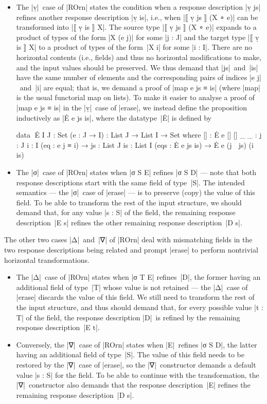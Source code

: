 \begin{itemize}
\item The |ṿ|~case of |ROrn| states the condition when a response description |ṿ js| refines another response description |ṿ is|, i.e., when |⟦ ṿ js ⟧ (X ∘ e)| can be transformed into |⟦ ṿ is ⟧ X|.
The source type |⟦ ṿ js ⟧ (X ∘ e)| expands to a product of types of the form |X (e j)| for some |j : J| and the target type |⟦ ṿ is ⟧ X| to a product of types of the form~|X i| for some |i : I|.
There are no horizontal contents (i.e., fields) and thus no horizontal modifications to make, and the input values should be preserved.
We thus demand that |js|~and~|is| have the same number of elements and the corresponding pairs of indices |e j|~and~|i| are equal; that is, we demand a proof of |map e js ≡ is| (where |map| is the usual functorial map on lists).
To make it easier to analyse a proof of |map e js ≡ is| in the |ṿ|~case of |erase|, we instead define the proposition inductively as |Ė e js is|, where the datatype~|Ė| is defined by
\begin{code}
data ^^^Ė {I J : Set} (e : J → I) : List J → List I → Set where
  []   :  Ė e [] []
  _∷_  :  {j : J} {i : I} (eq : e j ≡ i) →
          {js : List J} {is : List I} (eqs : Ė e js is) → Ė e (j ∷ js) (i ∷ is)
\end{code}
\item The |σ|~case of |ROrn| states when |σ S E| refines |σ S D| --- note that both response descriptions start with the same field of type~|S|.
The intended semantics --- the |σ|~case of |erase| --- is to preserve (copy) the value of this field.
To be able to transform the rest of the input structure, we should demand that, for any value |s : S| of the field, the remaining response description~|E s| refines the other remaining response description~|D s|.
\end{itemize}
The other two cases |Δ|~and~|∇| of |ROrn| deal with mismatching fields in the two response descriptions being related and prompt |erase| to perform nontrivial horizontal transformations.
\begin{itemize}
\item The |Δ|~case of |ROrn| states when |σ T E| refines~|D|, the former having an additional field of type~|T| whose value is not retained --- the |Δ|~case of |erase| discards the value of this field.
We still need to transform the rest of the input structure, and thus should demand that, for every possible value |t : T| of the field, the response description |D|~is refined by the remaining response description~|E t|.
\item Conversely, the |∇|~case of |ROrn| states when |E|~refines |σ S D|, the latter having an additional field of type~|S|.
The value of this field needs to be restored by the |∇|~case of |erase|, so the |∇|~constructor demands a default value |s : S| for the field.
To be able to continue with the transformation, the |∇|~constructor also demands that the response description~|E| refines the remaining response description~|D s|.
\end{itemize}

